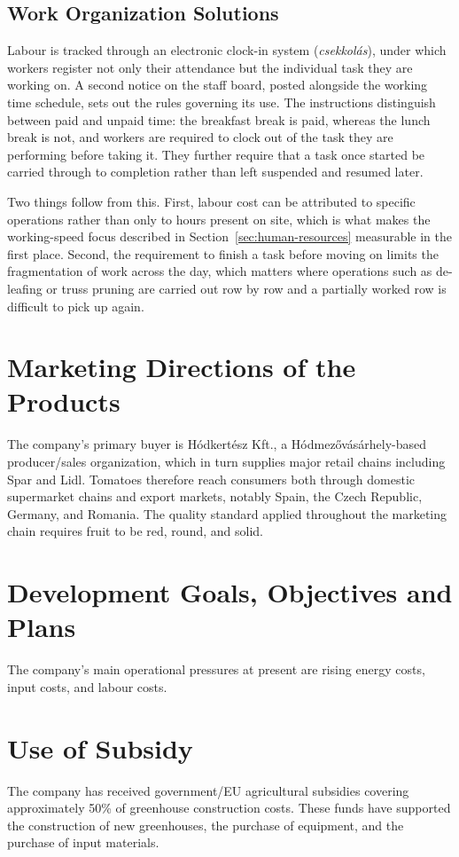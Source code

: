 \subsection{Work Organization Solutions}
Labour is tracked through an electronic clock-in system (\emph{csekkolás}), under which workers register not only their attendance but the individual task they are working on. A second notice on the staff board, posted alongside the working time schedule, sets out the rules governing its use. The instructions distinguish between paid and unpaid time: the breakfast break is paid, whereas the lunch break is not, and workers are required to clock out of the task they are performing before taking it. They further require that a task once started be carried through to completion rather than left suspended and resumed later.

Two things follow from this. First, labour cost can be attributed to specific operations rather than only to hours present on site, which is what makes the working-speed focus described in Section~\ref{sec:human-resources} measurable in the first place. Second, the requirement to finish a task before moving on limits the fragmentation of work across the day, which matters where operations such as de-leafing or truss pruning are carried out row by row and a partially worked row is difficult to pick up again.





\section{Marketing Directions of the Products}
\label{sec:marketing}
The company's primary buyer is Hódkertész Kft., a Hódmezővásárhely-based producer/sales organization, which in turn supplies major retail chains including Spar and Lidl. Tomatoes therefore reach consumers both through domestic supermarket chains and export markets, notably Spain, the Czech Republic, Germany, and Romania. The quality standard applied throughout the marketing chain requires fruit to be red, round, and solid.

\section{Development Goals, Objectives and Plans}
The company's main operational pressures at present are rising energy costs, input costs, and labour costs. 
\section{Use of Subsidy}
\label{sec:subsidies}
The company has received government/EU agricultural subsidies covering approximately 50\% of greenhouse construction costs. These funds have supported the construction of new greenhouses, the purchase of equipment, and the purchase of input materials.
